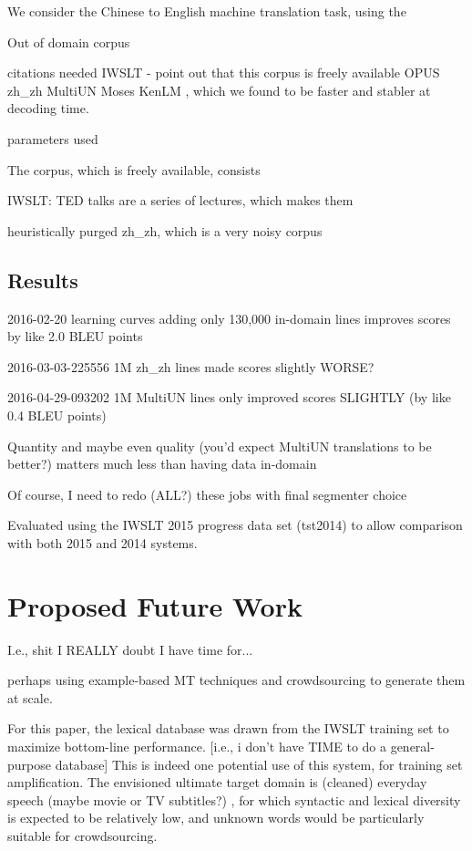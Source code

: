 We consider the Chinese to English machine translation task, using the 

Out of domain corpus

citations needed
IWSLT  - point out that this corpus is freely available
OPUS zh\_zh  MultiUN 
Moses 
KenLM , which we found to be faster and stabler at decoding time.

parameters used

The corpus, which is freely available, consists 

IWSLT: TED talks are a series of lectures, which makes them 



heuristically purged zh\_zh, which is a very noisy corpus

\subsection{Results}

2016-02-20 learning curves adding only 130,000 in-domain lines improves scores by like 2.0 BLEU points

2016-03-03-225556 1M zh\_zh lines made scores slightly WORSE?

2016-04-29-093202 1M MultiUN lines only improved scores SLIGHTLY (by like 0.4 BLEU points)

Quantity and maybe even quality (you'd expect MultiUN translations to be better?) matters much less than having data in-domain

Of course, I need to redo (ALL?) these jobs with final segmenter choice

Evaluated using the IWSLT 2015 progress data set (tst2014) to allow comparison with both 2015 and 2014 systems.


\section{Proposed Future Work}

I.e., shit I REALLY doubt I have time for...


perhaps using example-based MT techniques  and crowdsourcing to generate them at scale.

For this paper, the lexical database was drawn from the IWSLT training set to maximize bottom-line performance.
[i.e., i don't have TIME to do a general-purpose database]
This is indeed one potential use of this system, for training set amplification.
The envisioned ultimate target domain is (cleaned) everyday speech (maybe movie or TV subtitles?) , for which syntactic and lexical diversity is expected to be relatively low, and unknown words would be particularly suitable for crowdsourcing.

